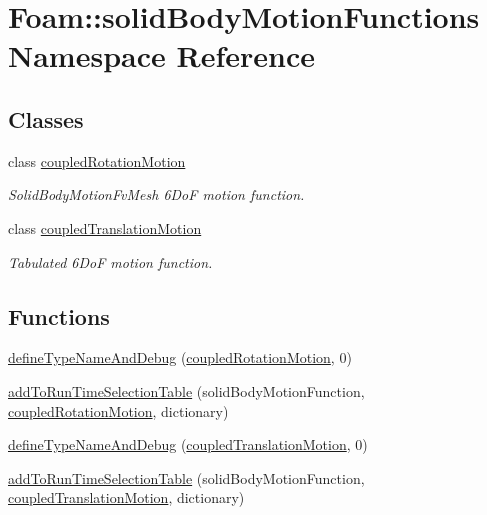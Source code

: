 \hypertarget{namespaceFoam_1_1solidBodyMotionFunctions}{}\section{Foam\+:\+:solid\+Body\+Motion\+Functions Namespace Reference}
\label{namespaceFoam_1_1solidBodyMotionFunctions}
\subsection*{Classes}
\begin{DoxyCompactItemize}
\item 
class \hyperlink{classFoam_1_1solidBodyMotionFunctions_1_1coupledRotationMotion}{coupled\+Rotation\+Motion}
\begin{DoxyCompactList}\small\item\em Solid\+Body\+Motion\+Fv\+Mesh 6\+DoF motion function. \end{DoxyCompactList}\item 
class \hyperlink{classFoam_1_1solidBodyMotionFunctions_1_1coupledTranslationMotion}{coupled\+Translation\+Motion}
\begin{DoxyCompactList}\small\item\em Tabulated 6\+DoF motion function. \end{DoxyCompactList}\end{DoxyCompactItemize}
\subsection*{Functions}
\begin{DoxyCompactItemize}
\item 
\hyperlink{namespaceFoam_1_1solidBodyMotionFunctions_a9e5cca3c9cd59bd041ee2bd58e39d18b}{define\+Type\+Name\+And\+Debug} (\hyperlink{classFoam_1_1solidBodyMotionFunctions_1_1coupledRotationMotion}{coupled\+Rotation\+Motion}, 0)
\item 
\hyperlink{namespaceFoam_1_1solidBodyMotionFunctions_a37dd1333e197ce68ad264c531951c1dd}{add\+To\+Run\+Time\+Selection\+Table} (solid\+Body\+Motion\+Function, \hyperlink{classFoam_1_1solidBodyMotionFunctions_1_1coupledRotationMotion}{coupled\+Rotation\+Motion}, dictionary)
\item 
\hyperlink{namespaceFoam_1_1solidBodyMotionFunctions_a876035600fb19fe1c4386ed582bd3041}{define\+Type\+Name\+And\+Debug} (\hyperlink{classFoam_1_1solidBodyMotionFunctions_1_1coupledTranslationMotion}{coupled\+Translation\+Motion}, 0)
\item 
\hyperlink{namespaceFoam_1_1solidBodyMotionFunctions_acd639119976345eb2647d95f119584e1}{add\+To\+Run\+Time\+Selection\+Table} (solid\+Body\+Motion\+Function, \hyperlink{classFoam_1_1solidBodyMotionFunctions_1_1coupledTranslationMotion}{coupled\+Translation\+Motion}, dictionary)
\end{DoxyCompactItemize}


